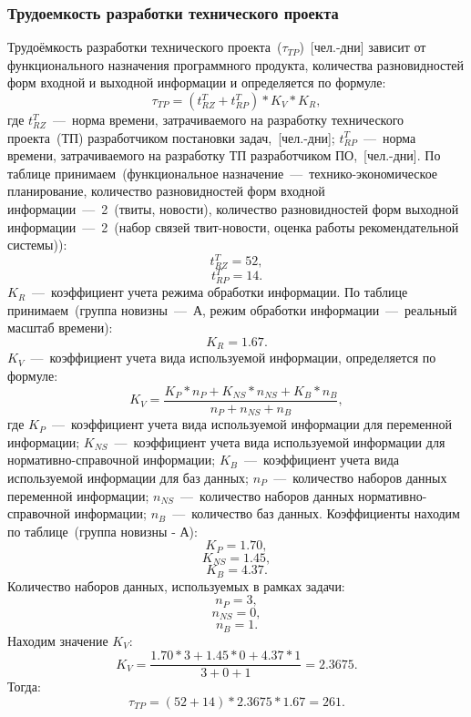         \subsubsection{Трудоемкость разработки технического проекта}
            Трудоёмкость разработки технического проекта~($\tau_{TP}$)~[чел.-дни] зависит от функционального назначения программного продукта, количества разновидностей форм входной и выходной информации и определяется по формуле:
            $$\tau_{TP} = (t^T_{RZ} + t^T_{RP})*K_V*K_R,$$
            где $t^T_{RZ}$~---~норма времени, затрачиваемого на разработку технического проекта~(ТП) разработчиком постановки задач,~[чел.-дни];
            $t^T_{RP}$~---~норма времени, затрачиваемого на разработку ТП разработчиком ПО,~[чел.-дни].
            По таблице принимаем~(функциональное назначение~---~технико-экономическое планирование,
            количество разновидностей форм входной информации~---~2~(твиты, новости),
            количество разновидностей форм выходной информации~---~2~(набор связей твит-новости, оценка работы рекомендательной системы)):
            $$t^T_{RZ} = 52,$$
            $$t^T_{RP} = 14.$$
            $K_R$~---~коэффициент учета режима обработки информации. По таблице принимаем~(группа новизны~---~А, режим обработки информации~---~реальный масштаб времени):
            $$K_R = 1.67.$$
            $K_V$~---~коэффициент учета вида используемой информации, определяется по формуле:
            $$K_V = \dfrac {K_P*n_P + K_{NS}*n_{NS} + K_B*n_B} {n_P + n_{NS} + n_B },$$
            где $K_P$~---~коэффициент учета вида используемой информации для переменной информации;
            $K_{NS}$~---~коэффициент учета вида используемой информации для нормативно-справочной информации;
            $K_B$~---~коэффициент учета вида используемой информации для баз данных;
            $n_P$~---~количество наборов данных переменной информации;
            $n_{NS}$~---~количество наборов данных нормативно-справочной информации;
            $n_B$~---~количество баз данных.
            Коэффициенты находим по таблице~(группа новизны - А):
            $$K_P=1.70,$$
            $$K_{NS}=1.45,$$
            $$K_B=4.37.$$
            Количество наборов данных, используемых в рамках задачи:
            $$n_P=3,$$
            $$n_{NS}=0,$$
            $$n_B=1.$$
            Находим значение $K_V$:
            $$K_V = \dfrac{1.70*3+1.45*0+4.37*1}{3+0+1}=2.3675.$$
            Тогда:
            $$\tau_{TP} = (52+14)*2.3675*1.67 = 261.$$

